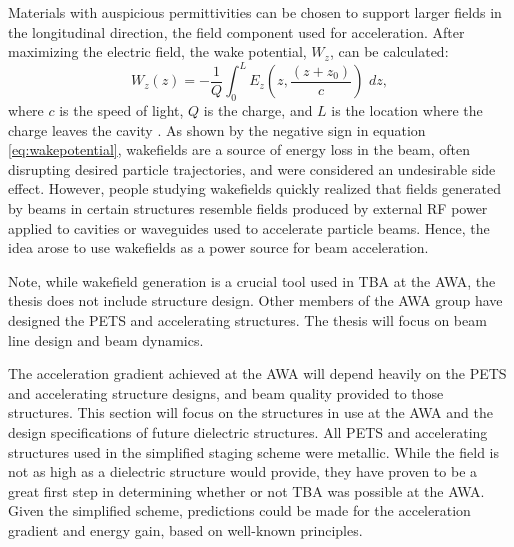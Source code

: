 Materials with auspicious permittivities can be chosen to support larger fields
in the longitudinal direction, the field component 
used for acceleration.   
After maximizing the electric field, the wake potential, $W_z$, can be calculated: 
\begin{equation}
W_z\left(z\right)= -\frac{1}{Q} \int_{0}^{L} E_z \left(z,\frac{\left(z+z_0\right)}{c}\right)\,\,dz,
\label{eq:wakepotential}
\end{equation} 
where $c$ is the speed of light, $Q$ is the charge, 
and $L$ is the location where the charge leaves the cavity \cite{SLACwakefields}.
As shown by the negative sign in equation \ref{eq:wakepotential}, wakefields are a source of 
energy loss in the beam, often disrupting desired particle trajectories, 
and were considered an undesirable side effect.
However, people studying wakefields quickly realized that fields
generated by beams in certain structures resemble fields produced by external RF power 
applied to cavities or waveguides used to accelerate particle beams.
Hence, the idea arose to use wakefields as a power source for beam acceleration. 

Note, while wakefield generation is a crucial tool used in TBA at the AWA, the thesis does not include 
structure design. Other members of the AWA group have designed the PETS and accelerating
structures. The thesis will focus on beam line design and beam dynamics. 



The acceleration gradient achieved at the AWA will depend heavily 
on the PETS and accelerating structure designs, and beam quality 
provided to those structures. This section will focus on the 
structures in use at the AWA and the design specifications of future 
dielectric structures. All PETS and accelerating structures 
used in the simplified staging scheme were metallic. 
While the field is not as high as a dielectric structure would provide,
they have proven to be a great first step 
in determining whether or not TBA was possible at the AWA. Given 
the simplified scheme, predictions could be made for the acceleration 
gradient and energy gain, based on well-known principles. 


